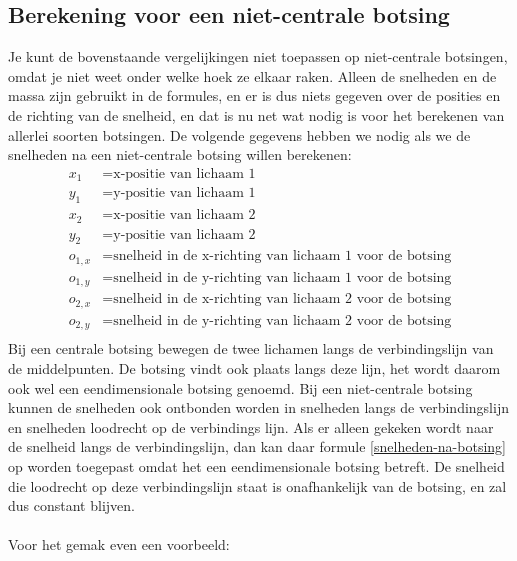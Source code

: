 \documentclass[12pt,a4paper]{article}
\begin{document}
	\subsection{Berekening voor een niet-centrale botsing}
	Je kunt de bovenstaande vergelijkingen niet toepassen op niet-centrale botsingen, omdat je niet weet onder welke hoek ze elkaar raken. Alleen de snelheden en de massa zijn gebruikt in de formules, en er is dus niets gegeven over de posities en de richting van de snelheid, en dat is nu net wat nodig is voor het berekenen van allerlei soorten botsingen. De volgende gegevens hebben we nodig als we de snelheden na een niet-centrale botsing willen berekenen:
	\begin{equation}
		\begin{aligned}
			x_1 &= \text{x-positie van lichaam 1}\\
			y_1 &= \text{y-positie van lichaam 1}\\
			x_2 &= \text{x-positie van lichaam 2}\\
			y_2 &= \text{y-positie van lichaam 2}\\
			o_{1,x} &= \text{snelheid in de x-richting van lichaam 1 voor de botsing}\\
			o_{1,y} &= \text{snelheid in de y-richting van lichaam 1 voor de botsing}\\
			o_{2,x} &= \text{snelheid in de x-richting van lichaam 2 voor de botsing}\\
			o_{2,y} &= \text{snelheid in de y-richting van lichaam 2 voor de botsing}\\
		\end{aligned}
	\end{equation}
	Bij een centrale botsing bewegen de twee lichamen langs de verbindingslijn van de middelpunten. De botsing vindt ook plaats langs deze lijn, het wordt daarom ook wel een eendimensionale botsing genoemd. Bij een niet-centrale botsing kunnen de snelheden ook ontbonden worden in snelheden langs de verbindingslijn en snelheden loodrecht op de verbindings lijn. Als er alleen gekeken wordt naar de snelheid langs de verbindingslijn, dan kan daar formule \eqref{snelheden-na-botsing} op worden toegepast omdat het een eendimensionale botsing betreft. De snelheid die loodrecht op deze verbindingslijn staat is onafhankelijk van de botsing, en zal dus constant blijven.
	\\
	\\Voor het gemak even een voorbeeld:
\end{document}
